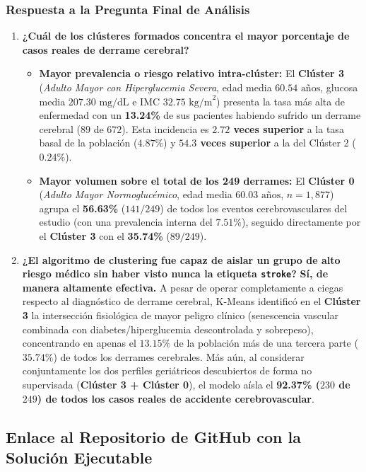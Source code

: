 \subsubsection{Respuesta a la Pregunta Final de Análisis}
\begin{enumerate}
    \item \textbf{¿Cuál de los clústeres formados concentra el mayor porcentaje de casos reales de derrame cerebral?}
    \begin{itemize}
        \item \textbf{Mayor prevalencia o riesgo relativo intra-clúster:} El \textbf{Clúster 3} (\textit{Adulto Mayor con Hiperglucemia Severa}, edad media $60.54\text{ años}$, glucosa media $207.30\text{ mg/dL}$ e IMC $32.75\text{ kg/m}^2$) presenta la tasa más alta de enfermedad con un \textbf{13.24\%} de sus pacientes habiendo sufrido un derrame cerebral ($89$ de $672$). Esta incidencia es \textbf{$2.72$ veces superior} a la tasa basal de la población ($4.87\%$) y \textbf{$54.3$ veces superior} a la del Clúster 2 ($0.24\%$).
        \item \textbf{Mayor volumen sobre el total de los 249 derrames:} El \textbf{Clúster 0} (\textit{Adulto Mayor Normoglucémico}, edad media $60.03\text{ años}$, $n = 1,877$) agrupa el \textbf{56.63\%} ($141/249$) de todos los eventos cerebrovasculares del estudio (con una prevalencia interna del $7.51\%$), seguido directamente por el \textbf{Clúster 3} con el \textbf{35.74\%} ($89/249$).
    \end{itemize}
    \item \textbf{¿El algoritmo de clustering fue capaz de aislar un grupo de alto riesgo médico sin haber visto nunca la etiqueta \texttt{stroke}?}
    \textbf{Sí, de manera altamente efectiva.} A pesar de operar completamente a ciegas respecto al diagnóstico de derrame cerebral, K-Means identificó en el \textbf{Clúster 3} la intersección fisiológica de mayor peligro clínico (senescencia vascular combinada con diabetes/hiperglucemia descontrolada y sobrepeso), concentrando en apenas el $13.15\%$ de la población más de una tercera parte ($35.74\%$) de todos los derrames cerebrales. Más aún, al considerar conjuntamente los dos perfiles geriátricos descubiertos de forma no supervisada (\textbf{Clúster 3 + Clúster 0}), el modelo aísla el \textbf{92.37\% ($230$ de $249$) de todos los casos reales de accidente cerebrovascular}.
\end{enumerate}

\subsection{Enlace al Repositorio de GitHub con la Solución Ejecutable}

